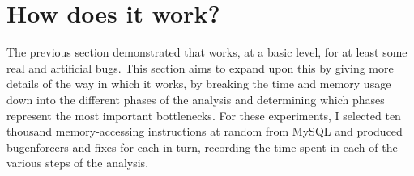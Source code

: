 \section{How does it work?}
\label{sect:eval:how_does_it_work}
\newcommand{\subphase}[2]{$\mathbb{#1}_{#2}$}
\newcommand{\subcrash}[1]{\subphase{C}{#1}}
\newcommand{\subinterfering}[1]{\subphase{I}{#1}}
\newcommand{\subenf}[1]{\subphase{E}{#1}}
\newcommand{\subfix}[1]{\subphase{F}{#1}}

The previous section demonstrated that {\technique} works, at a basic
level, for at least some real and artificial bugs.  This section aims
to expand upon this by giving more details of the way in which it
works, by breaking the time and memory usage down into the different
phases of the analysis and determining which phases represent the most
important bottlenecks.  For these experiments, I selected ten thousand
memory-accessing instructions at random from MySQL and produced
\glspl{bugenforcer} and fixes for each in turn, recording the time
spent in each of the various steps of the analysis.


